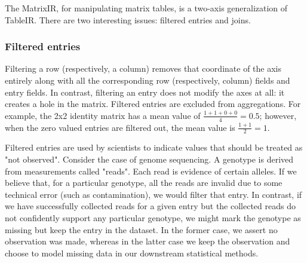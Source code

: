 \documentclass[sigconf, nonacm]{acmart}
\begin{document}





The MatrixIR, for manipulating matrix tables, is a two-axis generalization of TableIR. There are two
interesting issues: filtered entries and joins.

\subsubsection{Filtered entries}

Filtering a row (respectively, a column) removes that coordinate of the axis entirely along with all
the corresponding row (respectively, column) fields and entry fields. In contrast, filtering an
entry does not modify the axes at all: it creates a hole in the matrix. Filtered entries are
excluded from aggregations. For example, the 2x2 identity matrix has a mean value of $\frac{1 + 1 +
  0 + 0}{4} = 0.5$; however, when the zero valued entries are filtered out, the mean value is
$\frac{1 + 1}{2} = 1$.

Filtered entries are used by scientists to indicate values that should be treated as "not
observed". Consider the case of genome sequencing. A genotype is derived from measurements called
"reads". Each read is evidence of certain alleles. If we believe that, for a particular genotype,
all the reads are invalid due to some technical error (such as contamination), we would filter that
entry. In contrast, if we have successfully collected reads for a given entry but the collected
reads do not confidently support any particular genotype, we might mark the genotype as missing but
keep the entry in the dataset. In the former case, we assert no observation was made, whereas in the
latter case we keep the observation and choose to model missing data in our downstream statistical
methods.
\end{document}
